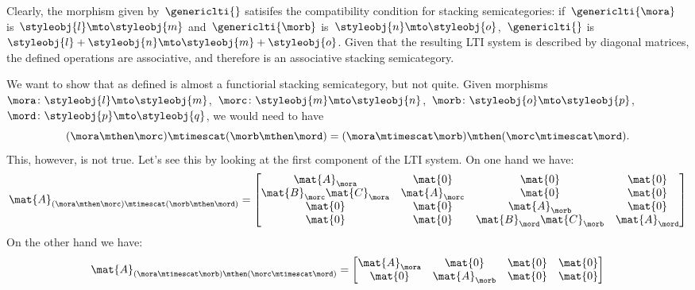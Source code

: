 Clearly, the morphism given by~$\genericlti{}$ satisifes the compatibility condition for stacking semicategories:
if~$\genericlti{\mora}$ is~$\styleobj{l}\mto \styleobj{m}$ and~$\genericlti{\morb}$ is~$\styleobj{n}\mto \styleobj{o}$,~$\genericlti{}$ is~$\styleobj{l}+\styleobj{n}\mto \styleobj{m}+\styleobj{o}$.
Given that the resulting LTI system is described by diagonal matrices, the defined operations are associative, and therefore \LTI is an associative stacking semicategory.

\begin{example}
    We want to show that \LTI as defined is almost a functiorial stacking semicategory, but not quite.
    Given morphisms~$\mora\colon \styleobj{l}\mto \styleobj{m}$,~$\morc\colon \styleobj{m}\mto \styleobj{n}$,~$\morb\colon \styleobj{o}\mto \styleobj{p}$,~$\mord\colon \styleobj{p}\mto \styleobj{q}$, we would need to have
    \begin{equation*}
        (\mora \mthen \morc)\mtimescat (\morb\mthen \mord)=(\mora\mtimescat \morb)\mthen (\morc\mtimescat \mord).
    \end{equation*}
    This, however, is not true.
    Let's see this by looking at the first component of the LTI system.
    On one hand we have:
    \begin{equation*}
        \mat{A}_{(\mora \mthen \morc)\mtimescat (\morb\mthen \mord)}=
        \begin{bmatrix}
            \mat{A}_\mora              & \mat{0}       & \mat{0}                    & \mat{0}       \\
            \mat{B}_\morc\mat{C}_\mora & \mat{A}_\morc & \mat{0}                    & \mat{0}       \\
            \mat{0}                    & \mat{0}       & \mat{A}_\morb              & \mat{0}       \\
            \mat{0}                    & \mat{0}       & \mat{B}_\mord\mat{C}_\morb & \mat{A}_\mord
        \end{bmatrix}
    \end{equation*}
    On the other hand we have:
    \begin{equation*}
        \mat{A}_{(\mora\mtimescat \morb)\mthen (\morc\mtimescat \mord)}=
        \begin{bmatrix}
            \mat{A}_\mora               & \mat{0}                     & \mat{0}       & \mat{0}       \\
            \mat{0}                     & \mat{A}_\morb               & \mat{0}       & \mat{0}       \\

\end{bmatrix}
\end{equation*}
\end{example}
